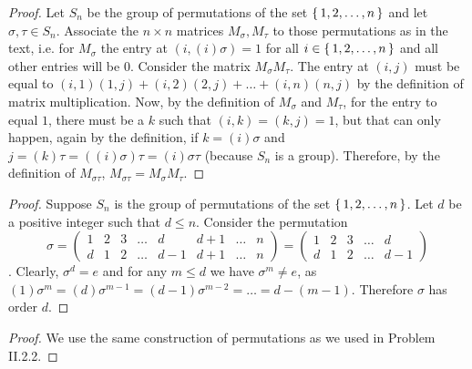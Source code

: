 \begin{problem}
\end{problem}

\begin{proof}
	Let $S_n$ be the group of permutations of the set $\left\{\,1,2,\dots,n\,\right\}$ and let $\sigma,\tau \in S_n$. Associate the $n \times n$ matrices $M_\sigma, M_\tau$ to those permutations as in the text, i.e. for $M_\sigma$ the entry at $(i, (i)\sigma)=1$ for all $i \in \left\{\,1,2,\dots,n\,\right\}$ and all other entries will be $0$. Consider the matrix $M_\sigma M_\tau$. The entry at $(i,j)$ must be equal to $(i,1)(1,j)+(i,2)(2,j)+\dots+(i,n)(n,j)$ by the definition of matrix multiplication. Now, by the definition of $M_\sigma$ and $M_\tau$, for the entry to equal $1$, there must be a $k$ such that $(i,k)=(k,j)=1$, but that can only happen, again by the definition, if $k = (i)\sigma$ and $j = (k)\tau=((i)\sigma)\tau=(i)\sigma\tau$ (because $S_n$ is a group). Therefore, by the definition of $M_{\sigma\tau}$, $M_{\sigma\tau}=M_\sigma M_\tau$.
\end{proof}

\begin{problem}
\end{problem}

\begin{proof}
	Suppose $S_n$ is the group of permutations of the set $\left\{\,1,2,\dots,n\,\right\}$. Let $d$ be a positive integer such that $d \leq n$. Consider the permutation 
	\[\sigma =
	\begin{pmatrix}
		1 & 2 & 3 & \dots & d & d + 1 & \dots & n\\
		d & 1 & 2 & \dots & d - 1 & d + 1 & \dots & n
	\end{pmatrix}
	=
	\begin{pmatrix}
	1 & 2 & 3 & \dots & d\\
	d & 1 & 2 & \dots & d - 1
	\end{pmatrix}
	\].
	Clearly, $\sigma^d=e$ and for any $m \leq d$ we have $\sigma^m \neq e$, as $(1)\sigma^m=(d)\sigma^{m-1}=(d-1)\sigma^{m-2}=\dots=d-(m-1)$. Therefore $\sigma$ has order $d$.
\end{proof}

\begin{problem}
\end{problem}

\begin{proof}
	We use the same construction of permutations as we used in Problem II.2.2.
\end{proof}

